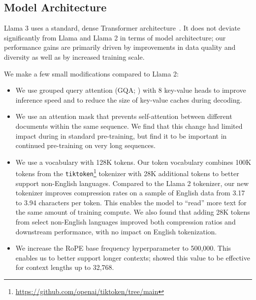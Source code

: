 \subsection{Model Architecture}
\label{section:pretraining_model_architecture}

Llama 3 uses a standard, dense Transformer architecture~\citep{vaswani2017attention}.
It does not deviate significantly from Llama and Llama 2 \citep{touvron2023llama,touvron2023llama2} in terms of model architecture; our performance gains are primarily driven by improvements in data quality and diversity as well as by increased training scale.

We make a few small modifications compared to Llama 2:
\begin{itemize}
    \item We use grouped query attention (GQA; \citet{ainslie2023gqa}) with 8 key-value heads to improve inference speed and to reduce the size of key-value caches during decoding.
    \item We use an attention mask that prevents self-attention between different documents within the same sequence.
    We find that this change had limited impact during in standard pre-training, but find it to be important in continued pre-training on very long sequences.
    \item We use a vocabulary with 128K tokens. Our token vocabulary combines 100K tokens from the \texttt{tiktoken}\footnote{\url{https://github.com/openai/tiktoken/tree/main}} tokenizer with 28K additional tokens to better support non-English languages. Compared to the Llama 2 tokenizer, our new tokenizer improves compression rates on a sample of English data from 3.17 to 3.94 characters per token. This enables the model to ``read'' more text for the same amount of training compute. We also found that adding 28K tokens from select non-English languages improved both compression ratios and downstream performance, with no impact on English tokenization.
    \item We increase the RoPE base frequency hyperparameter to 500,000. This enables us to better support longer contexts; \citet{xiong2023effective} showed this value to be effective for context lengths up to 32,768.
\end{itemize}

